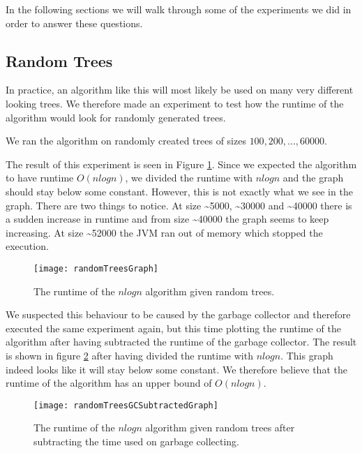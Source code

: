 In the following sections we will walk through some of the experiments we did in order to answer these questions.

\subsection{Random Trees}
In practice, an algorithm like this will most likely be used on many very different looking trees. We therefore made an experiment to test how the runtime of the algorithm would look for randomly generated trees.

We ran the algorithm on randomly created trees of sizes $100, 200, ..., 60000$.

The result of this experiment is seen in Figure \ref{randomTreesGraph}. Since we expected the algorithm to have runtime $O(nlogn)$, we divided the runtime with $nlogn$ and the graph should stay below some constant. However, this is not exactly what we see in the graph. There are two things to notice. At size \textasciitilde 5000, \textasciitilde 30000 and \textasciitilde 40000 there is a sudden increase in runtime and from size \textasciitilde 40000 the graph seems to keep increasing. At size \textasciitilde 52000 the JVM ran out of memory which stopped the execution.

\begin{figure}
	\texttt{[image: randomTreesGraph]}
	\caption{The runtime of the $nlogn$ algorithm given random trees.}
	\label{randomTreesGraph}
\end{figure}

We suspected this behaviour to be caused by the garbage collector and therefore executed the same experiment again, but this time plotting the runtime of the algorithm after having subtracted the runtime of the garbage collector. The result is shown in figure \ref{randomTreesGCSubtractedGraph} after having divided the runtime with $nlogn$. This graph indeed looks like it will stay below some constant. We therefore believe that the runtime of the algorithm has an upper bound of $O(nlogn)$.


\begin{figure}
	\texttt{[image: randomTreesGCSubtractedGraph]}
	\caption{The runtime of the $nlogn$ algorithm given random trees after subtracting the time used on garbage collecting.}
	\label{randomTreesGCSubtractedGraph}
\end{figure}

